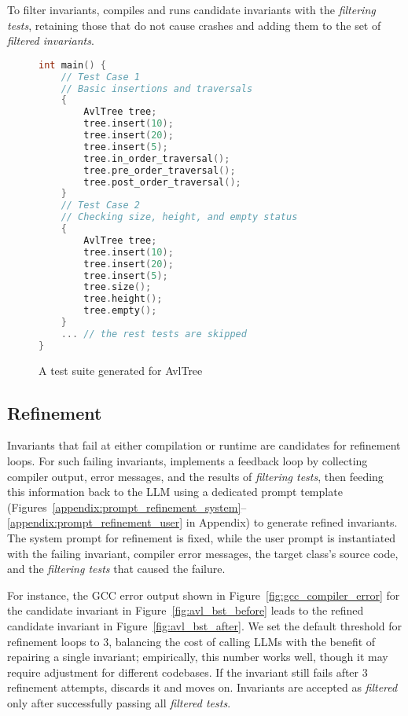 To filter invariants, \tech compiles and runs candidate invariants with the \textit{filtering tests}, retaining those that do not cause crashes and adding them to the set of \textit{filtered invariants}.


\begin{figure}[htp]
\begin{lstlisting}[language=c++, escapechar=!]
int main() {
    // Test Case 1
    // Basic insertions and traversals
    {
        AvlTree tree;
        tree.insert(10);
        tree.insert(20);
        tree.insert(5);
        tree.in_order_traversal();
        tree.pre_order_traversal();
        tree.post_order_traversal();
    }
    // Test Case 2
    // Checking size, height, and empty status
    {
        AvlTree tree;
        tree.insert(10);
        tree.insert(20);
        tree.insert(5);
        tree.size();
        tree.height();
        tree.empty();
    }
    ... // the rest tests are skipped
}
\end{lstlisting}
    \caption{A test suite generated for AvlTree}
    \label{fig:avl_tests}
\end{figure}


\subsection{Refinement}
\label{sec:refinement}
Invariants that fail at either compilation or runtime are candidates for refinement loops. For such failing invariants, \tech implements a feedback loop by collecting compiler output, error messages, and the results of \textit{filtering tests}, then feeding this information back to the LLM using a dedicated prompt template (Figures~\ref{appendix:prompt_refinement_system}--\ref{appendix:prompt_refinement_user} in Appendix) to generate refined invariants. The system prompt for refinement is fixed, while the user prompt is instantiated with the failing invariant, compiler error messages, the target class’s source code, and the \textit{filtering tests} that caused the failure.

For instance, the GCC error output shown in Figure~\ref{fig:gcc_compiler_error} for the  candidate invariant in Figure~\ref{fig:avl_bst_before} leads to the refined candidate invariant in Figure~\ref{fig:avl_bst_after}. We set the default threshold for refinement loops to 3, balancing the cost of calling LLMs with the benefit of repairing a single invariant; empirically, this number works well, though it may require adjustment for different codebases. If the invariant still fails after 3 refinement attempts, \tech discards it and moves on. Invariants are accepted as \textit{filtered} only after successfully passing all \textit{filtered tests}.


